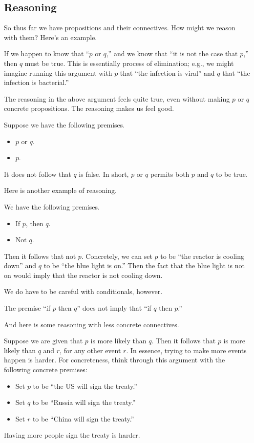 \documentclass[../notes.tex]{subfiles}
\begin{document}
\subsection{Reasoning}
So thus far we have propositions and their connectives. How might we reason with them? Here's an example.
\begin{example}
	If we happen to know that ``$p$ or $q$,'' and we know that ``it is not the case that $p$,'' then $q$ must be true. This is essentially process of elimination; e.g., we might imagine running this argument with $p$ that ``the infection is viral'' and $q$ that ``the infection is bacterial.''
\end{example}
The reasoning in the above argument feels quite true, even without making $p$ or $q$ concrete propositions. The reasoning makes us feel good.
\begin{warn}
	Suppose we have the following premises.
	\begin{itemize}
		\item $p$ or $q$.
		\item $p$.
	\end{itemize}
	It does not follow that $q$ is false. In short, $p$ or $q$ permits both $p$ and $q$ to be true.
\end{warn}
Here is another example of reasoning.
\begin{example}
	We have the following premises.
	\begin{itemize}
		\item If $p$, then $q$.
		\item Not $q$.
	\end{itemize}
	Then it follows that not $p$. Concretely, we can set $p$ to be ``the reactor is cooling down'' and $q$ to be ``the blue light is on.'' Then the fact that the blue light is not on would imply that the reactor is not cooling down.
\end{example}
We do have to be careful with conditionals, however.
\begin{warn}
	The premise ``if $p$ then $q$'' does not imply that ``if $q$ then $p$.''
\end{warn}
And here is some reasoning with less concrete connectives.
\begin{example}
	Suppose we are given that $p$ is more likely than $q$. Then it follows that $p$ is more likely than $q$ and $r$, for any other event $r$. In essence, trying to make more events happen is harder. For concreteness, think through this argument with the following concrete premises:
	\begin{itemize}
		\item Set $p$ to be ``the US will sign the treaty.''
		\item Set $q$ to be ``Russia will sign the treaty.''
		\item Set $r$ to be ``China will sign the treaty.''
	\end{itemize}
	Having more people sign the treaty is harder.
\end{example}
\end{document}

